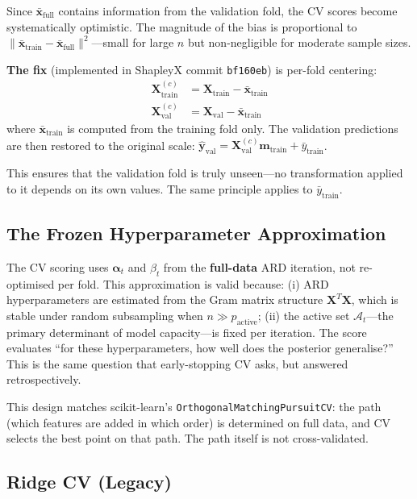 \documentclass[11pt,a4paper]{article}
\begin{document}
Since $\bar{\mathbf{x}}_{\text{full}}$ contains information from the validation fold, the CV scores become systematically optimistic. The magnitude of the bias is proportional to $\|\bar{\mathbf{x}}_{\text{train}} - \bar{\mathbf{x}}_{\text{full}}\|^2$---small for large $n$ but non-negligible for moderate sample sizes.

\textbf{The fix} (implemented in ShapleyX commit \texttt{bf160eb}) is per-fold centering:
\begin{align}
\mathbf{X}_{\text{train}}^{(c)} &= \mathbf{X}_{\text{train}} - \bar{\mathbf{x}}_{\text{train}} \label{eq:fix_train} \\
\mathbf{X}_{\text{val}}^{(c)} &= \mathbf{X}_{\text{val}} - \bar{\mathbf{x}}_{\text{train}} \label{eq:fix_val}
\end{align}
where $\bar{\mathbf{x}}_{\text{train}}$ is computed from the training fold only. The validation predictions are then restored to the original scale: $\hat{\mathbf{y}}_{\text{val}} = \mathbf{X}_{\text{val}}^{(c)} \mathbf{m}_{\text{train}} + \bar{y}_{\text{train}}$.

This ensures that the validation fold is truly unseen---no transformation applied to it depends on its own values. The same principle applies to $\bar{y}_{\text{train}}$.

\subsection{The Frozen Hyperparameter Approximation}

The CV scoring uses $\boldsymbol{\alpha}_t$ and $\beta_t$ from the \textbf{full-data} ARD iteration, not re-optimised per fold. This approximation is valid because: (i) ARD hyperparameters are estimated from the Gram matrix structure $\mathbf{X}^T\mathbf{X}$, which is stable under random subsampling when $n \gg p_{\text{active}}$; (ii) the active set $\mathcal{A}_t$---the primary determinant of model capacity---is fixed per iteration. The score evaluates ``for these hyperparameters, how well does the posterior generalise?'' This is the same question that early-stopping CV asks, but answered retrospectively.

This design matches scikit-learn's \texttt{OrthogonalMatchingPursuitCV}: the path (which features are added in which order) is determined on full data, and CV selects the best point on that path. The path itself is not cross-validated.

\subsection{Ridge CV (Legacy)}
\end{document}
